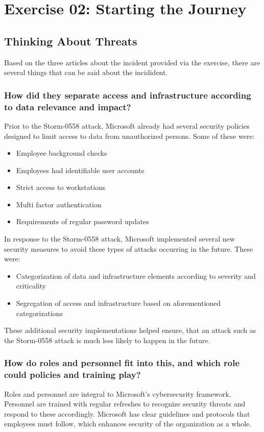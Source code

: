 \section{Exercise 02: Starting the Journey}
\subsection{Thinking About Threats}
Based on the three articles about the incident provided via the exercise, there are several things that can be said about the incidident.
\subsubsection{How did they separate access and infrastructure according to data relevance and impact?}
Prior to the Storm-0558 attack, Microsoft already had several security policies designed to limit access to data from unauthorized persons. Some of these were:

\begin{itemize}
    \item Employee background checks
    \item Employees had identifiable user accounts
    \item Strict access to workstations
    \item Multi factor authentication
    \item Requirements of regular password updates
\end{itemize}

In response to the Storm-0558 attack, Microsoft implemented several new security measures to avoid these types of attacks occurring in the future. These were:

\begin{itemize}
    \item Categorization of data and infrastructure elements according to severity and criticality
    \item Segregation of access and infrastructure based on aforementioned categorizations
\end{itemize}

These additional security implementations helped ensure, that an attack such as the Storm-0558 attack is much less likely to happen in the future.

\subsubsection{How do roles and personnel fit into this, and which role could policies and training play?}
Roles and personnel are integral to Microsoft's cybersecurity framework. Personnel are trained with regular refreshes to recognize security threats and respond to these accordingly. Microsoft has clear guidelines and protocols that employees must follow, which enhances security of the organization as a whole.


